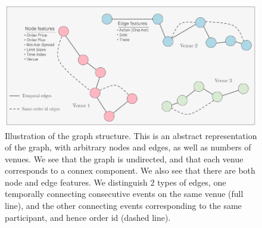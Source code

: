 \documentclass[switch, 11pt]{article}
\begin{document}
\begin{figure}
    \centering
    \includegraphics[width=0.7\columnwidth]{figures/graph_structure.png}
    \caption{Illustration of the graph structure. This is an abstract representation of the graph, with arbitrary nodes and edges, as well as numbers of venues. We see that the graph is undirected, and that each venue corresponds to a connex component. We also see that there are both node and edge features. We distinguish $2$ types of edges, one temporally connecting consecutive events on the same venue (full line), and the other connecting events corresponding to the same participant, and hence order id (dashed line).}
    \label{fig:graph_structure}
\end{figure}
\end{document}
